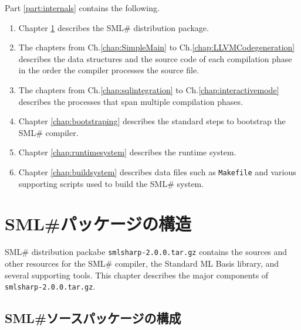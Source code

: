 \documentclass{jbook}
\newif\ifjp
\newcommand{\txt}[2]{#1}
\newcommand{\smlsharp}{SML\#}
\newcommand{\code}[1]{\mbox{\large\tt #1}}
\begin{document}
	Part \ref{part:internals} contains the following.
\begin{enumerate}
\item Chapter \ref{chap:package} describes the \smlsharp{} distribution
package.
\item 
      The chapters from Ch.\ref{chap:SimpleMain} to
Ch.\ref{chap:LLVMCodegeneration} describes the data structures and the
source code of each compilation phase in the order the compiler
processes  the source file.
\item 
	The chapters from Ch.\ref{chap:sqlintegration} to
Ch.\ref{chap:interactivemode} describes the processes that span
multiple compilation phases.
\item Chapter \ref{chap:bootstraping} describes the standard steps to
bootstrap the \smlsharp{} compiler.
\item 
	Chapter \ref{chap:runtimesystem} describes the runtime system.
\item 
	Chapter \ref{chap:buildsystem} describes data files such as
\code{Makefile} and various supporting scripts used to build the
\smlsharp{} system. 
\end{enumerate}
\fi%


% 
\chapter{\txt{\smlsharp{}パッケージの構造}{The Structure of \smlsharp{} Distribution}}
\label{chap:package}

\ifjp%
	\smlsharp{}配布パッケージ\code{smlsharp-2.0.0.tar.gz}は，
\smlsharp{}コンパイラ，基本ライブラリ，サポートツールのソースを含む．
	本章では，\code{smlsharp-2.0.0.tar.gz}の構造を記述する．
\else%
	\smlsharp{} distribution packabe \code{smlsharp-2.0.0.tar.gz}
contains the sources and other resources for the \smlsharp{} compiler,
the Standard ML Basis library, and several supporting tools.
	This chapter describes the major components of
\code{smlsharp-2.0.0.tar.gz}.
\fi%

\section{\txt
{\smlsharp{}ソースパッケージの構成}
{The Source Distribution of the \smlsharp{} Compiler}
}
\end{document}
